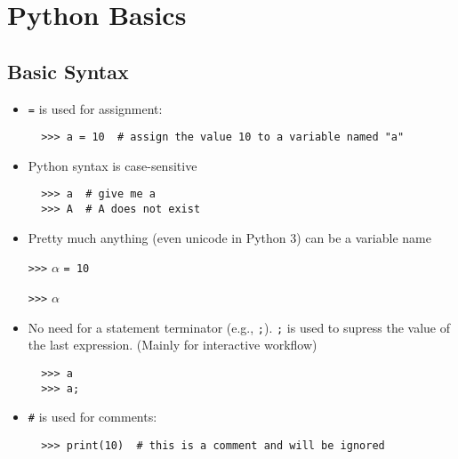 \documentclass[10pt,article]{article}
\begin{document}
\section{Python Basics}
\label{sec:org04ad9ce}
\subsection{Basic Syntax}
\label{sec:org513b632}
\begin{itemize}
\item \texttt{=} is used for assignment:

\begin{verbatim}
  >>> a = 10  # assign the value 10 to a variable named "a"
\end{verbatim}
\end{itemize}

\begin{itemize}
\item Python syntax is case-sensitive

\begin{verbatim}
  >>> a  # give me a
  >>> A  # A does not exist
\end{verbatim}
\end{itemize}

\begin{itemize}
\item Pretty much anything (even unicode in Python 3) can be a variable name

\iffalse
\begin{verbatim}
  >>> α = 10
  >>> α
\end{verbatim}
\fi

\texttt{>>>} \(\alpha\) \texttt{= 10}

\texttt{>>>} \(\alpha\)
\end{itemize}

\begin{itemize}
\item No need for a statement terminator (e.g., \texttt{;}). \texttt{;} is used to supress the
value of the last expression. (Mainly for interactive workflow)

\begin{verbatim}
  >>> a
  >>> a;
\end{verbatim}
\end{itemize}

\begin{itemize}
\item \texttt{\#} is used for comments:

\begin{verbatim}
  >>> print(10)  # this is a comment and will be ignored
\end{verbatim}
\end{itemize}
\end{document}
